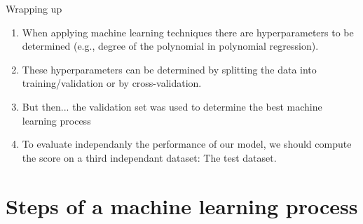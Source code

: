 \documentclass[handout]{beamer}
\begin{document}
\begin{frame}{Wrapping up}
\begin{enumerate}[<+->]
    \item When applying machine learning techniques there are \alert{hyperparameters} to be determined (e.g., degree of the polynomial in polynomial regression).
    \item These \alert{hyperparameters}  can be determined by splitting the data into training/validation or by cross-validation.
    \item But then... the validation set was used to determine the best machine learning process
    \item To evaluate independanly the performance of our model, we should compute the score on a \alert{third independant dataset: The test dataset}.
    
\end{enumerate}
\end{frame}

\section{Steps of a machine learning process}
\end{document}
